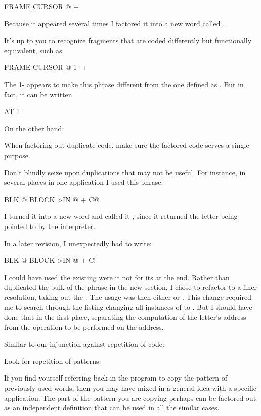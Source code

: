 \begin{Code}
FRAME  CURSOR @ +
\end{Code}
Because it appeared several times I factored it into a new word called
.

It's up to you to recognize fragments that are coded differently but
functionally equivalent, such as:

\begin{Code}
FRAME  CURSOR @ 1-  +
\end{Code}
The 1- appears to make this phrase different from the one defined as
. But in fact, it can be written

\begin{Code}
AT 1-
\end{Code}
On the other hand:

\begin{tip}
When factoring out duplicate code, make sure the factored code serves
a single purpose.
\end{tip}
Don't blindly seize upon duplications that may not be useful. For
instance, in several places in one application I used this phrase:

\begin{Code}
BLK @ BLOCK  >IN @ +  C@
\end{Code}
I turned it into a new word and called it , since it
returned the letter being pointed to by the interpreter.

In a later revision, I unexpectedly had to write:

\begin{Code}
BLK @ BLOCK  >IN @ +  C!
\end{Code}
I could have used the existing  were it not for its
 at the end. Rather than duplicated the bulk of the phrase
in the new section, I chose to refactor  to a finer
resolution, taking out the .  The usage was then either
 or . This change required me to
search through the listing changing all instances of  to
.  But I should have done that in the first place,
separating the computation of the letter's address from the operation
to be performed on the address.

Similar to our injunction against repetition of code:

\begin{tip}
Look for repetition of patterns.
\end{tip}
If you find yourself referring back in the program to copy the pattern
of previously-used words, then you may have mixed in a general idea
with a specific application. The part of the pattern you are copying
perhaps can be factored out as an independent definition that can be
used in all the similar cases.

